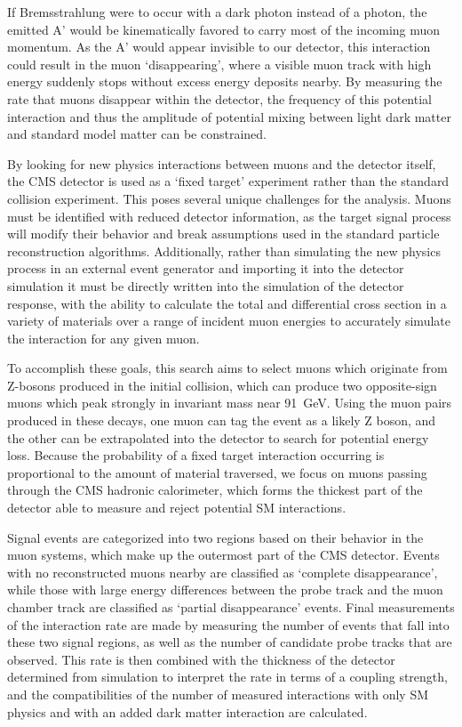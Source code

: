 If Bremsstrahlung were to occur with a dark photon instead of a photon, the emitted A' would be kinematically favored to carry most of the incoming muon momentum.
As the A' would appear invisible to our detector, this interaction could result in the muon `disappearing', where a visible muon track with high energy suddenly stops without excess energy deposits nearby.
By measuring the rate that muons disappear within the detector, the frequency of this potential interaction and thus the amplitude of potential mixing between light dark matter and standard model matter can be constrained.

By looking for new physics interactions between muons and the detector itself, the CMS detector is used as a `fixed target' experiment rather than the standard collision experiment.
This poses several unique challenges for the analysis.
Muons must be identified with reduced detector information, as the target signal process will modify their behavior and break assumptions used in the standard particle reconstruction algorithms.
Additionally, rather than simulating the new physics process in an external event generator and importing it into the detector simulation it must be directly written into the simulation of the detector response, with the ability to calculate the total and differential cross section in a variety of materials over a range of incident muon energies to accurately simulate the interaction for any given muon.

To accomplish these goals, this search aims to select muons which originate from Z-bosons produced in the initial collision, which can produce two opposite-sign muons which peak strongly in invariant mass near \SI{91}{\giga\eV}.
Using the muon pairs produced in these decays, one muon can tag the event as a likely Z boson, and the other can be extrapolated into the detector to search for potential energy loss.
Because the probability of a fixed target interaction occurring is proportional to the amount of material traversed, we focus on muons passing through the CMS hadronic calorimeter, which forms the thickest part of the detector able to measure and reject potential SM interactions.

Signal events are categorized into two regions based on their behavior in the muon systems, which make up the outermost part of the CMS detector. 
Events with no reconstructed muons nearby are classified as `complete disappearance', while those with large energy differences between the probe track and the muon chamber track are classified as `partial disappearance' events.
Final measurements of the interaction rate are made by measuring the number of events that fall into these two signal regions, as well as the number of candidate probe tracks that are observed.
This rate is then combined with the thickness of the detector determined from simulation to interpret the rate in terms of a coupling strength, and the compatibilities of the number of measured interactions with only SM physics and with an added dark matter interaction are calculated.


